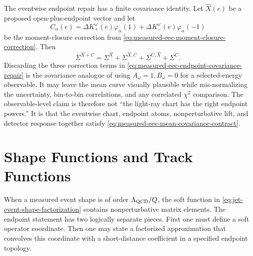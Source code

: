 \begin{controlledapproximation}
The eventwise endpoint repair has a finite covariance identity.  Let
\(\widehat X(e)\) be a proposed open-plus-endpoint vector and let
\[
  C_\alpha(e)
  =
  \Delta K^\omega_+(e)\varphi_\alpha(1)
  +
  \Delta K^\omega_-(e)\varphi_\alpha(-1)
\]
be the moment-closure correction from
\eqref{eq:measured-eec-moment-closure-correction}.  Then
\begin{equation}
  \Sigma^{\widehat X+C}
  =
  \Sigma^{\widehat X}
  +\Sigma^{\widehat X,C}
  +\Sigma^{C,\widehat X}
  +\Sigma^C .
  \label{eq:measured-eec-endpoint-covariance-repair}
\end{equation}
Discarding the three correction terms in
\eqref{eq:measured-eec-endpoint-covariance-repair} is the covariance analogue
of using \(A_\omega=1,B_\omega=0\) for a selected-energy observable.  It may
leave the mean curve visually plausible while mis-normalizing the uncertainty,
bin-to-bin correlations, and any correlated \(\chi^2\) comparison.  The
observable-level claim is therefore not ``the light-ray chart has the right
endpoint powers.''  It is that the eventwise chart, endpoint atoms,
nonperturbative lift, and detector response together satisfy
\eqref{eq:measured-eec-mean-covariance-contract}.
\end{controlledapproximation}

\section{Shape Functions and Track Functions}

When a measured event shape is of order \(\Lambda_{\rm QCD}/Q\), the soft
function in \eqref{eq:jet-event-shape-factorization} contains
nonperturbative matrix elements.  The endpoint statement has two logically
separate pieces.  First one must define a soft operator coordinate.  Then one
may state a factorized approximation that convolves this coordinate with a
short-distance coefficient in a specified endpoint topology.

